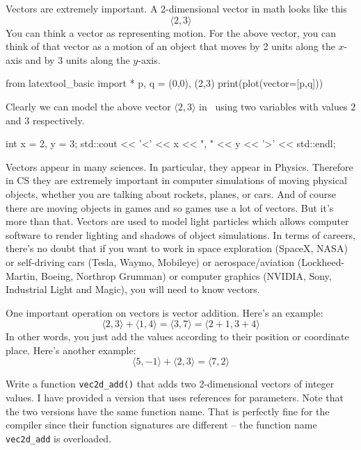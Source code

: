Vectors are extremely important.
A 2-dimensional vector in math looks like this
\[
\langle 2, 3 \rangle
\]
You can think a vector as representing motion.
For the above vector, you can think of that
vector as a motion of an object that moves
by 2 units along the $x$-axis and
by 3 units along the $y$-axis.

\begin{python}
from latextool_basic import *
p, q = (0,0), (2,3)
print(plot(vector=[p,q]))
\end{python}

Clearly we can model the above vector
$\langle 2, 3 \rangle$
in \cpp\
using two variables with values $2$ and $3$ respectively.
\begin{console}
int x = 2, y = 3;
std::cout << '<' << x << ", " << y << '>' << std::endl;
\end{console}

Vectors appear in many sciences. 
In particular, they appear in Physics.
Therefore in CS they are 
extremely important in computer simulations of moving physical objects, whether
you are talking about rockets, planes, or cars.
And of course there are moving objects in games
and so games use a lot of vectors.
But it's more than that.
Vectors are used to model light particles which allows
computer software to render lighting and shadows of object simulations.
In terms of careers, there's no doubt that if you want to work in
space exploration (SpaceX, NASA) or self-driving cars (Tesla, Waymo,
Mobileye) or aerospace/aviation (Lockheed-Martin, Boeing, Northrop Grumman)
or computer graphics (NVIDIA, Sony, Industrial Light and Magic), you
will need to know vectors.

One important operation on vectors is vector addition.
Here's an example: 
\[
\langle 2, 3 \rangle
+
\langle 1, 4 \rangle
=
\langle 3, 7 \rangle
=
\langle 2+1, 3+4 \rangle
\]
In other words, you just add the values according to their
position or coordinate place.
Here's another example:
\[
\langle 5, -1 \rangle
+
\langle 2, 3 \rangle
=
\langle 7, 2 \rangle
\]


Write a function \verb!vec2d_add()! that adds two 2-dimensional vectors
of integer values.
I have provided a version that uses references for parameters.
Note that the two versions have the same function name.
That is perfectly fine for the compiler since their function
signatures are different -- the function name \verb!vec2d_add!
is overloaded.

